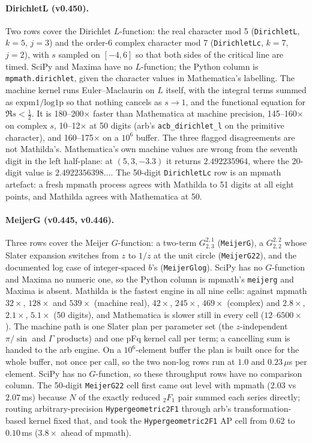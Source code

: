 \documentclass[11pt]{article}
\newcommand{\mcode}[1]{\texttt{\textcolor{mCode}{#1}}}
\begin{document}
\paragraph{DirichletL (v0.450).} Two rows cover the Dirichlet $L$-function: the real
character mod 5 (\mcode{DirichletL}, $k=5$, $j=3$) and the order-6 complex character mod 7
(\mcode{DirichletLc}, $k=7$, $j=2$), with $s$ sampled on $[-4,6]$ so that both sides of the
critical line are timed. SciPy and Maxima have no $L$-function; the Python column is
\mcode{mpmath.dirichlet}, given the character values in Mathematica's labelling. The machine
kernel runs Euler--Maclaurin on $L$ itself, with the integral terms summed as
$\mathrm{expm1}/\mathrm{log1p}$ so that nothing cancels as $s\to 1$, and the functional
equation for $\Re s<\tfrac12$. It is 180--200$\times$ faster than Mathematica at machine
precision, 145--160$\times$ on complex $s$, 10--12$\times$ at 50 digits (arb's
\mcode{acb\_dirichlet\_l} on the primitive character), and 160--175$\times$ on a $10^6$
buffer. The three flagged disagreements are not Mathilda's. Mathematica's own machine values
are wrong from the seventh digit in the left half-plane: at $(5,3,-3.3)$ it returns
$2.492235964$, where the 20-digit value is $2.4922356398\ldots$. The 50-digit
\mcode{DirichletLc} row is an mpmath artefact: a fresh mpmath process agrees with Mathilda
to 51 digits at all eight points, and Mathilda agrees with Mathematica at 50.

\paragraph{MeijerG (v0.445, v0.446).} Three rows cover the Meijer $G$-function: a two-term
$G^{2,1}_{2,3}$ (\mcode{MeijerG}), a $G^{2,2}_{2,2}$ whose Slater expansion switches from
$z$ to $1/z$ at the unit circle (\mcode{MeijerG22}), and the documented log case of
integer-spaced $b$'s (\mcode{MeijerGlog}). SciPy has no $G$-function and Maxima no numeric
one, so the Python column is mpmath's \mcode{meijerg} and Maxima is absent. Mathilda is the
fastest engine in all nine cells: against mpmath $32\times$, $128\times$ and $539\times$
(machine real), $42\times$, $245\times$, $469\times$ (complex) and $2.8\times$,
$2.1\times$, $5.1\times$ (50 digits), and Mathematica is slower still in every cell
($12$--$6500\times$). The machine path is one Slater plan per parameter set (the
$z$-independent $\pi/\sin$ and $\Gamma$ products) and one pFq kernel call per term; a
cancelling sum is handed to the arb engine. On a $10^6$-element buffer the plan is built
once for the whole buffer, not once per call, so the two non-log rows run at $1.0$ and
$0.23\,\mu$s per element. SciPy has no $G$-function, so these throughput rows have no
comparison column. The 50-digit
\mcode{MeijerG22} cell first came out level with mpmath ($2.03$ vs $2.07$\,ms) because
$N$ of the exactly reduced $_2F_1$ pair summed each series directly; routing
arbitrary-precision \mcode{Hypergeometric2F1} through arb's transformation-based kernel
fixed that, and took the \mcode{Hypergeometric2F1} AP cell from $0.62$ to $0.10$\,ms
($3.8\times$ ahead of mpmath).
\end{document}
